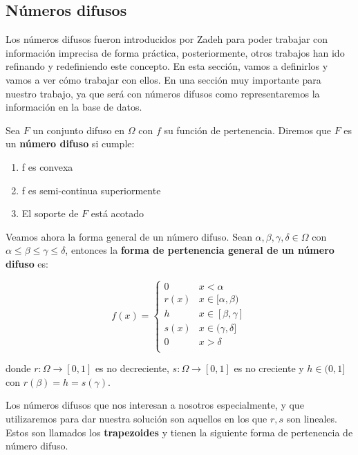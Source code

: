 \subsection{Números difusos}

Los números difusos fueron introducidos por Zadeh \cite{fuzzynumberszadeh} para poder trabajar con información imprecisa de forma práctica, posteriormente, otros trabajos han ido refinando y redefiniendo este concepto. En esta sección, vamos a definirlos y vamos a ver cómo trabajar con ellos. En una sección muy importante para nuestro trabajo, ya que será con números difusos como representaremos la información en la base de datos. 

\begin{definition}
Sea $F$ un conjunto difuso en $\Omega$ con $f$ su función de pertenencia. Diremos que $F$ es un \textbf{número difuso} si cumple:

\begin{enumerate}
    \item f es convexa
    \item f es semi-continua superiormente
    \item El soporte de $F$ está acotado 
\end{enumerate}
\end{definition}

Veamos ahora la forma general de un número difuso. Sean $\alpha, \beta, \gamma, \delta \in \Omega$ con $\alpha \leq \beta \leq \gamma \leq \delta$, entonces la \textbf{forma de pertenencia general de un número difuso} es:

\begin{equation*}
    f(x) = \left\{ { \begin{array}{cc}
                    0 & x < \alpha \\ 
                    r(x) & x\in [\alpha,\beta) \\
                    h & x\in [\beta,\gamma] \\
                    s(x) & x\in (\gamma,\delta] \\
                    0 & x > \delta \\ 
                    \end{array}  } \right.
\end{equation*}

donde $r: \Omega \longrightarrow [0,1]$ es no decreciente, $s: \Omega \longrightarrow [0,1]$ es no creciente y $h \in (0,1]$ con $r(\beta) = h = s(\gamma)$.

Los números difusos que nos interesan a nosotros especialmente, y que utilizaremos para dar nuestra solución son aquellos en los que $r,s$ son lineales. Estos son llamados los \textbf{trapezoides} y tienen la siguiente forma de pertenencia de número difuso.

